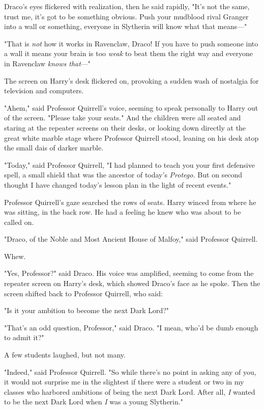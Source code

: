 Draco's eyes flickered with realization, then he said rapidly, "It's not the 
same, trust me, it's got to be something obvious. Push your mudblood rival 
Granger into a wall or something, everyone in Slytherin will know what that 
means---"

"That is \emph{not} how it works in Ravenclaw, Draco! If you have to push 
someone into a wall it means your brain is too \emph{weak} to beat them the 
right way and everyone in Ravenclaw \emph{knows that}---"

The screen on Harry's desk flickered on, provoking a sudden wash of nostalgia 
for television and computers.

"Ahem," said Professor Quirrell's voice, seeming to speak personally to Harry 
out of the screen. "Please take your seats."
\sbreak
And the children were all seated and staring at the repeater screens on their 
desks, or looking down directly at the great white marble stage where Professor 
Quirrell stood, leaning on his desk atop the small dais of darker marble.

"Today," said Professor Quirrell, "I had planned to teach you your first 
defensive spell, a small shield that was the ancestor of today's 
\emph{Protego.} But on second thought I have changed today's lesson plan in the 
light of recent events."

Professor Quirrell's gaze searched the rows of seats. Harry winced from where 
he was sitting, in the back row. He had a feeling he knew who was about to be 
called on.

"Draco, of the Noble and Most Ancient House of Malfoy," said Professor Quirrell.

Whew.

"Yes, Professor?" said Draco. His voice was amplified, seeming to come from the 
repeater screen on Harry's desk, which showed Draco's face as he spoke. Then 
the screen shifted back to Professor Quirrell, who said:

"Is it your ambition to become the next Dark Lord?"

"That's an odd question, Professor," said Draco. "I mean, who'd be dumb enough 
to admit it?"

A few students laughed, but not many.

"Indeed," said Professor Quirrell. "So while there's no point in asking any of 
you, it would not surprise me in the slightest if there were a student or two 
in my classes who harbored ambitions of being the next Dark Lord. After all, 
\emph{I} wanted to be the next Dark Lord when \emph{I} was a young Slytherin."

